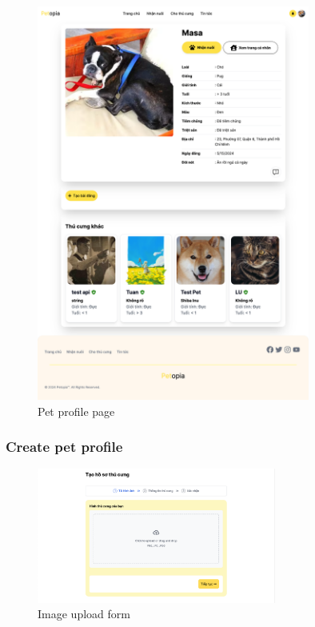 \begin{figure}[H]
    \centering
    \includegraphics[width=0.8\textwidth]{Figures/UI/pet_detail_ui.png}
    \caption{Pet profile page}
\end{figure}

\subsubsection{Create pet profile}

\begin{figure}[H]
    \centering
    \includegraphics[width=0.7\textwidth]{Figures/UI/image_upload_ui.png}
    \caption{Image upload form}
\end{figure}

